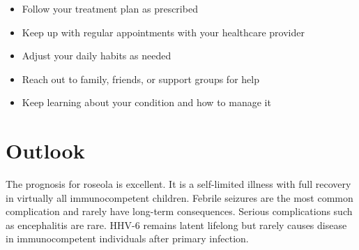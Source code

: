 \begin{itemize}[noitemsep]
  \item Follow your treatment plan as prescribed
  \item Keep up with regular appointments with your healthcare provider
  \item Adjust your daily habits as needed
  \item Reach out to family, friends, or support groups for help
  \item Keep learning about your condition and how to manage it
\end{itemize}

\section{Outlook}
The prognosis for roseola is excellent. It is a self-limited illness with full recovery in virtually all immunocompetent children. Febrile seizures are the most common complication and rarely have long-term consequences. Serious complications such as encephalitis are rare. HHV-6 remains latent lifelong but rarely causes disease in immunocompetent individuals after primary infection.
